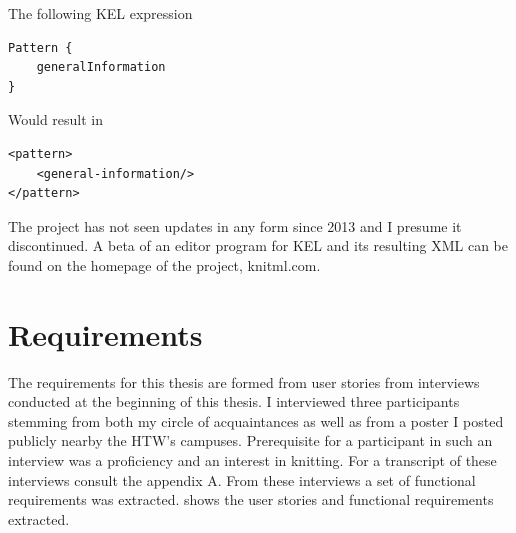 \documentclass[a4paper,11pt]{kth-mag}
\begin{document}
The following KEL expression

\begin{lstlisting}
Pattern {
    generalInformation
}
\end{lstlisting}

Would result in

\begin{lstlisting}
<pattern>
    <general-information/>
</pattern>
\end{lstlisting}

The project has not seen updates in any form since 2013 and I presume it
discontinued. A beta of an editor program for KEL and its resulting XML can be
found on the homepage of the project, knitml.com.


\chapter{Requirements}
The requirements for this thesis are formed from user stories from interviews
conducted at the beginning of this thesis. I interviewed three participants
stemming from both my circle of acquaintances as well as from a poster I posted
publicly nearby the HTW’s campuses. Prerequisite for a participant in such an
interview was a proficiency and an interest in knitting. For a transcript of
these interviews consult the appendix A. From these interviews a set of functional
requirements was extracted.  shows the user stories and
functional requirements extracted.
\end{document}
